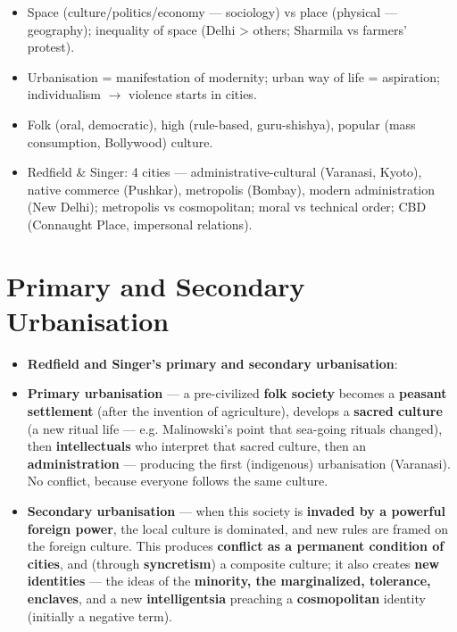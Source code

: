 \begin{QuickRevision}
\begin{itemize}
\item Space (culture/politics/economy --- sociology) vs place (physical --- geography); inequality of space (Delhi > others; Sharmila vs farmers' protest).
\item Urbanisation = manifestation of modernity; urban way of life = aspiration; individualism $\rightarrow$ violence starts in cities.
\item Folk (oral, democratic), high (rule-based, guru-shishya), popular (mass consumption, Bollywood) culture.
\item Redfield \& Singer: 4 cities --- administrative-cultural (Varanasi, Kyoto), native commerce (Pushkar), metropolis (Bombay), modern administration (New Delhi); metropolis vs cosmopolitan; moral vs technical order; CBD (Connaught Place, impersonal relations).
\end{itemize}
\end{QuickRevision}

\section{Primary and Secondary Urbanisation}

\begin{KeyConcept}
\begin{itemize}
\item \textbf{Redfield and Singer's primary and secondary urbanisation}:
\item \textbf{Primary urbanisation} --- a pre-civilized \textbf{folk society} becomes a \textbf{peasant settlement} (after the invention of agriculture), develops a \textbf{sacred culture} (a new ritual life --- e.g. Malinowski's point that sea-going rituals changed), then \textbf{intellectuals} who interpret that sacred culture, then an \textbf{administration} --- producing the first (indigenous) urbanisation (Varanasi). No conflict, because everyone follows the same culture.
\item \textbf{Secondary urbanisation} --- when this society is \textbf{invaded by a powerful foreign power}, the local culture is dominated, and new rules are framed on the foreign culture. This produces \textbf{conflict as a permanent condition of cities}, and (through \textbf{syncretism}) a composite culture; it also creates \textbf{new identities} --- the ideas of the \textbf{minority, the marginalized, tolerance, enclaves}, and a new \textbf{intelligentsia} preaching a \textbf{cosmopolitan} identity (initially a negative term).
\end{itemize}
\end{KeyConcept}

